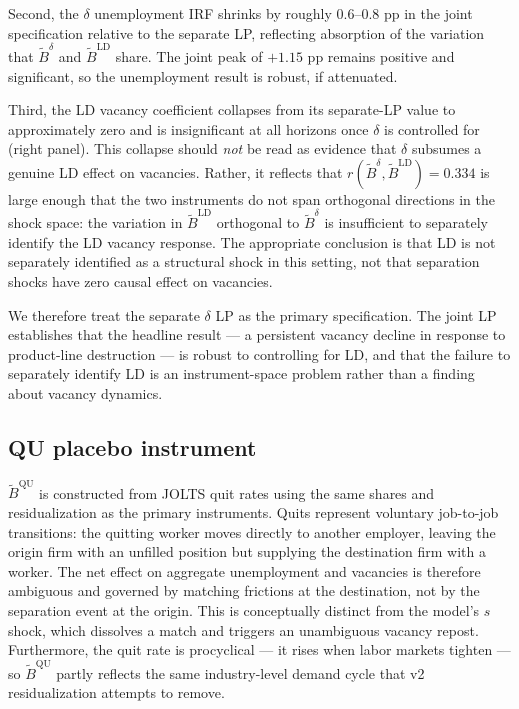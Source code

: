 \documentclass[authoryear, review, 12pt]{elsarticle}
\begin{document}
	Second, the $\delta$ unemployment IRF shrinks by roughly $0.6$--$0.8$
	pp in the joint specification relative to the separate LP, reflecting
	absorption of the variation that $\tilde{B}^\delta$ and
	$\tilde{B}^{\text{LD}}$ share.  The joint peak of $+1.15$ pp remains
	positive and significant, so the unemployment result is robust, if
	attenuated.

	Third, the LD vacancy coefficient collapses from its separate-LP value
	to approximately zero and is insignificant at all horizons once
	$\delta$ is controlled for (right panel).  This collapse should
	\emph{not} be read as evidence that $\delta$ subsumes a genuine LD
	effect on vacancies.  Rather, it reflects that
	$r(\tilde{B}^\delta,\tilde{B}^{\text{LD}})=0.334$ is large enough that
	the two instruments do not span orthogonal directions in the shock
	space: the variation in $\tilde{B}^{\text{LD}}$ orthogonal to
	$\tilde{B}^{\delta}$ is insufficient to separately identify the LD
	vacancy response.  The appropriate conclusion is that LD is not
	separately identified as a structural shock in this setting, not that
	separation shocks have zero causal effect on vacancies.

	We therefore treat the separate $\delta$ LP as the primary
	specification.  The joint LP establishes that the headline result ---
	a persistent vacancy decline in response to product-line destruction
	--- is robust to controlling for LD, and that the failure to separately
	identify LD is an instrument-space problem rather than a finding about
	vacancy dynamics.

	\subsection{QU placebo instrument}\label{app:qu_placebo}

	$\tilde{B}^{\text{QU}}$ is constructed from JOLTS quit rates using the
	same shares and residualization as the primary instruments.  Quits
	represent voluntary job-to-job transitions: the quitting worker moves
	directly to another employer, leaving the origin firm with an unfilled
	position but supplying the destination firm with a worker.  The net
	effect on aggregate unemployment and vacancies is therefore ambiguous
	and governed by matching frictions at the destination, not by the
	separation event at the origin.  This is conceptually distinct from the
	model's $s$ shock, which dissolves a match and triggers an unambiguous
	vacancy repost.  Furthermore, the quit rate is procyclical --- it rises
	when labor markets tighten --- so $\tilde{B}^{\text{QU}}$ partly
	reflects the same industry-level demand cycle that v2 residualization
	attempts to remove.
\end{document}
